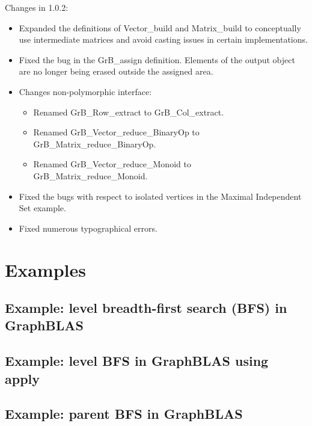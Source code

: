 Changes in 1.0.2:
\begin{itemize}
\item Expanded the definitions of {\sf Vector\_build} and {\sf Matrix\_build} to conceptually use intermediate matrices and avoid casting issues in certain implementations.
\item Fixed the bug in the {\sf GrB\_assign} definition. Elements of the output object are no longer being erased outside the assigned area.
\item Changes non-polymorphic interface:
    \begin{itemize}
    \item Renamed {\sf GrB\_Row\_extract} to {\sf GrB\_Col\_extract}.
    \item Renamed {\sf GrB\_Vector\_reduce\_BinaryOp} to {\sf GrB\_Matrix\_reduce\_BinaryOp}.
    \item Renamed {\sf GrB\_Vector\_reduce\_Monoid} to {\sf GrB\_Matrix\_reduce\_Monoid}.
    \end{itemize}
\item Fixed the bugs with respect to isolated vertices in the Maximal Independent Set example.
\item Fixed numerous typographical errors.
\end{itemize}  

\chapter{Examples}
\label{Chp:Examples}

\pagebreak
\nolinenumbers
\section{Example: level breadth-first search (BFS) in GraphBLAS}
{\scriptsize

}
\vfill

\pagebreak
\nolinenumbers
\section{Example: level BFS in GraphBLAS using apply}
{\scriptsize

}
\vfill

\pagebreak
\nolinenumbers
\section{Example: parent BFS in GraphBLAS}
{\scriptsize

}
\vfill

